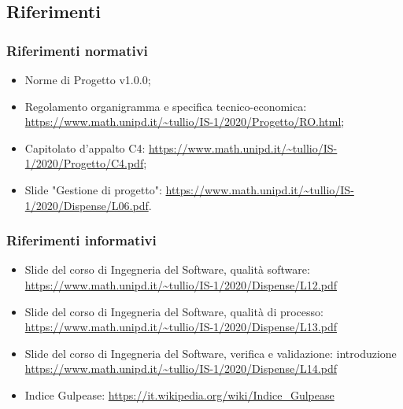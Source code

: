 \documentclass[../piano_di_qualifica.tex]{subfiles}
\begin{document}
\subsection{Riferimenti}

\subsubsection{Riferimenti normativi}
\begin{itemize}
	\item Norme di Progetto v1.0.0;
	\item Regolamento organigramma e specifica tecnico-economica: \url{https://www.math.unipd.it/~tullio/IS-1/2020/Progetto/RO.html};
	\item Capitolato d’appalto C4: \url{https://www.math.unipd.it/~tullio/IS-1/2020/Progetto/C4.pdf};
	\item Slide "Gestione di progetto": \url{https://www.math.unipd.it/~tullio/IS-1/2020/Dispense/L06.pdf}.
\end{itemize}

\subsubsection{Riferimenti informativi}

\begin{itemize}
	\item Slide del corso di Ingegneria del Software, qualità software: \url{https://www.math.unipd.it/~tullio/IS-1/2020/Dispense/L12.pdf}
	\item Slide del corso di Ingegneria del Software, qualità di processo: \url{https://www.math.unipd.it/~tullio/IS-1/2020/Dispense/L13.pdf}
	\item Slide del corso di Ingegneria del Software, verifica e validazione: introduzione \url{https://www.math.unipd.it/~tullio/IS-1/2020/Dispense/L14.pdf}
	\item Indice Gulpease: \url{https://it.wikipedia.org/wiki/Indice_Gulpease}
\end{itemize}
\end{document}
